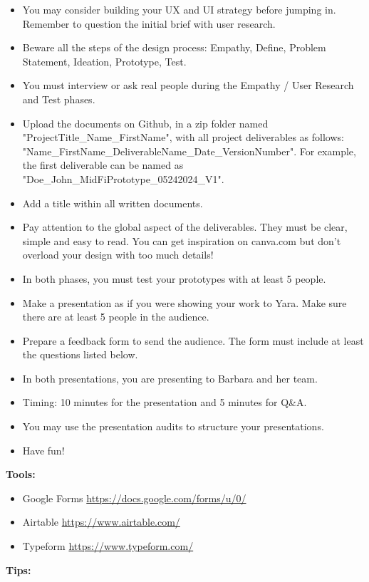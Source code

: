 \begin{itemize}
\item You may consider building your UX and UI strategy before jumping in. Remember to question the initial brief with user research.
\item Beware all the steps of the design process: Empathy, Define, Problem Statement, Ideation, Prototype, Test.
\item You must interview or ask real people during the Empathy / User Research and Test phases.
\item Upload the documents on Github, in a zip folder named "ProjectTitle\_Name\_FirstName", with all project deliverables as follows: "Name\_FirstName\_DeliverableName\_Date\_VersionNumber".  For example, the first deliverable can be named as "Doe\_John\_MidFiPrototype\_05242024\_V1".
\item Add a title within all written documents.
\item Pay attention to the global aspect of the deliverables. They must be clear, simple and easy to read. You can get inspiration on canva.com but don't overload your design with too much details!
\item In both phases, you must test your prototypes with at least 5 people.
\item Make a presentation as if you were showing your work to Yara. Make sure there are at least 5 people in the audience.
\item Prepare a feedback form to send the audience. The form must include at least the questions listed below.
\item In both presentations, you are presenting to Barbara and her team.
\item Timing: 10 minutes for the presentation and 5 minutes for Q\&A.
\item You may use the presentation audits to structure your presentations.
\item Have fun!
\end{itemize}

\textbf{Tools:}

\begin{itemize}
\item Google Forms \url{https://docs.google.com/forms/u/0/}
\item Airtable \url{https://www.airtable.com/}
\item Typeform \url{https://www.typeform.com/}
\end{itemize}

\textbf{Tips:}

